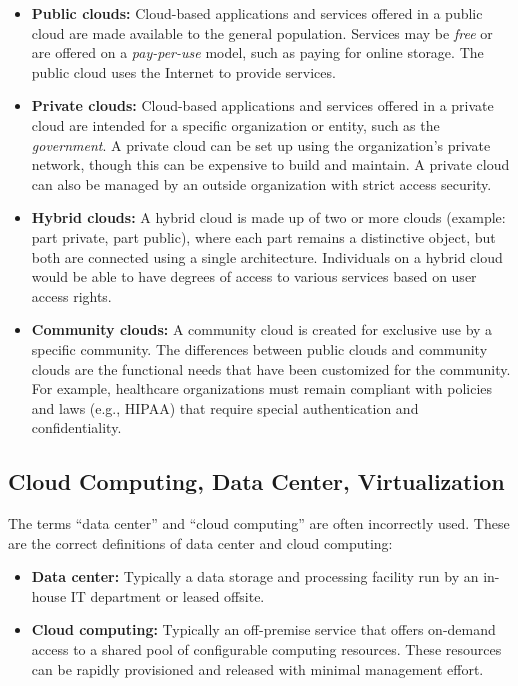 \begin{itemize}
\item \textbf{Public clouds:} Cloud-based applications and services offered in a public cloud are made available to the general population. Services may be \emph{free} or are offered on a \emph{pay-per-use} model, such as paying for online storage. The public cloud uses the Internet to provide services.

\item \textbf{Private clouds:} Cloud-based applications and services offered in a private cloud are intended for a specific organization or entity, such as the \emph{government}. A private cloud can be set up using the organization's private network, though this can be expensive to build and maintain. A private cloud can also be managed by an outside organization with strict access security.

\item \textbf{Hybrid clouds:} A hybrid cloud is made up of two or more clouds (example: part private, part public), where each part remains a distinctive object, but both are connected using a single architecture. Individuals on a hybrid cloud would be able to have degrees of access to various services based on user access rights.

\item \textbf{Community clouds:} A community cloud is created for exclusive use by a specific community. The differences between public clouds and community clouds are the functional needs that have been customized for the community. For example, healthcare organizations must remain compliant with policies and laws (e.g., HIPAA) that require special authentication and confidentiality.
\end{itemize}

\subsection{Cloud Computing, Data Center, Virtualization}

The terms ``data center'' and ``cloud computing'' are often incorrectly used. These are the correct definitions of data center and cloud computing:

\begin{itemize}
\item \textbf{Data center:} Typically a data storage and processing facility run by an in-house IT department or leased offsite.
\item \textbf{Cloud computing:} Typically an off-premise service that offers on-demand access to a shared pool of configurable computing resources. These resources can be rapidly provisioned and released with minimal management effort.
\end{itemize}

